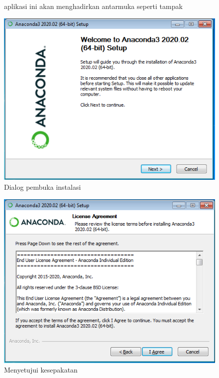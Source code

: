 \begin{figure}aplikasi ini akan menghadirkan antarmuka seperti tampak
  \begin{center}
    \includegraphics[scale=.5]{pics/anacondaInstall1.png}
    \caption{Dialog pembuka instalasi}
    \label{fig:pembuka}
  \end{center}
\end{figure}

\begin{figure}
  \begin{center}
    \includegraphics[scale=.5]{pics/anacondaInstall2.png}
    \caption{Menyetujui kesepakatan}
    \label{fig:kesepakatan}
  \end{center}
\end{figure}

